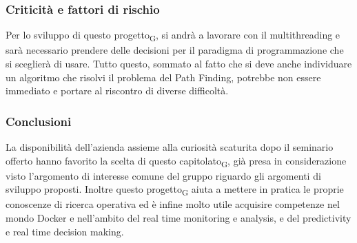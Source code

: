 \subsubsection{Criticità e fattori di rischio}
Per lo sviluppo di questo \gls{progetto}\textsubscript{G}, si andrà a lavorare con il multithreading e sarà necessario prendere delle decisioni per il paradigma di programmazione che si sceglierà di usare. 
Tutto questo, sommato al fatto che si deve anche individuare un algoritmo che risolvi il problema del Path Finding, potrebbe non essere immediato e portare al riscontro di diverse difficoltà.
\subsubsection{Conclusioni}
La disponibilità dell'azienda assieme alla curiosità scaturita dopo il seminario offerto hanno favorito la scelta di questo \gls{capitolato}\textsubscript{G}, già presa in considerazione visto l'argomento di interesse comune del gruppo riguardo gli argomenti di sviluppo proposti.
Inoltre questo \gls{progetto}\textsubscript{G} aiuta a mettere in pratica le proprie conoscenze di ricerca operativa ed è infine molto utile acquisire competenze nel mondo Docker e nell'ambito del real time monitoring e analysis, e del predictivity e real time decision making.